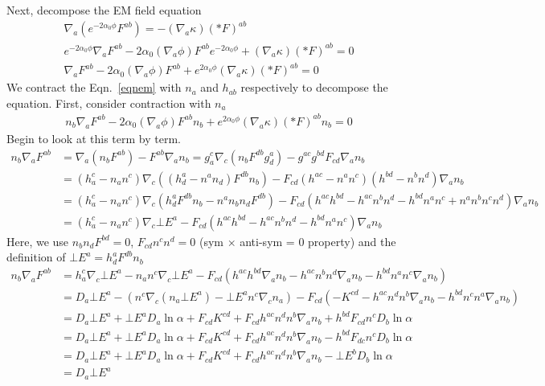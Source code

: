 \documentclass[prd]{revtex4}
\begin{document}
Next, decompose the EM field equation
\begin{align}
\label{eqnem}
\nabla_a \left(e^{-2 \alpha_0 \phi} F^{ab}\right) = - (\nabla_a \kappa) (\ast F)^{ab} \nonumber \\
e^{-2 \alpha_0 \phi} \nabla_a F^{ab} - 2 \alpha_0 (\nabla_a \phi) F^{ab} e^{-2 \alpha_0 \phi} + (\nabla_a \kappa) (\ast F)^{ab}=0 \nonumber \\
\nabla_a F^{ab} - 2 \alpha_0 (\nabla_a \phi) F^{ab}  + e^{2 \alpha_0 \phi} (\nabla_a \kappa) (\ast F)^{ab}=0 
\end{align}
We contract the Eqn.~\ref{eqnem} with $n_a$ and $h_{ab}$ respectively to decompose the equation. First, consider contraction with $n_a$
\begin{align}
n_b \nabla_a F^{ab} - 2 \alpha_0 (\nabla_a \phi) F^{ab} n_b  + e^{2 \alpha_0 \phi} (\nabla_a \kappa) (\ast F)^{ab} n_b=0 
\end{align}
Begin to look at this term by term.
\begin{align}
n_b \nabla_a F^{ab} &= \nabla_a  (n_b F^{ab}) - F^{ab} \nabla_a n_b = g^c_a \nabla_c  (n_b F^{db} g^a_d) - g^{ac} g^{bd} F_{cd} \nabla_a n_b \nonumber \\
			&=(h_a^c - n_a n^c) \nabla_c ((h_d^a - n^a n_d) F^{db} n_b) - F_{cd} (h^{ac} - n^a n^c)(h^{bd} - n^b n^d) \nabla_a n_b \nonumber \\	
			&= (h_a^c - n_a n^c) \nabla_c (h_d^a F^{db} n_b - n^a n_b n_d F^{db}) - F_{cd} (h^{ac} h^{bd} - h^{ac} n^b n^d - h^{bd} n^a n^c +n^a n^b n^c n^d) \nabla_a n_b \nonumber \\
			&= (h_a^c - n_a n^c) \nabla_c \bot E^a - F_{cd} (h^{ac} h^{bd} - h^{ac} n^b n^d - h^{bd} n^a n^c) \nabla_a n_b \nonumber
\end{align}
Here, we use $n_b n_d F^{bd} = 0$, $F_{cd} n^c n^d = 0$ (sym $\times$ anti-sym = 0 property) and the definition of $\bot E^a = h_d^a F^{db} n_b$
\begin{align}
\label{eqn7}
n_b \nabla_a F^{ab} &= h_a^c \nabla_c \bot E^a - n_a n^c \nabla_c \bot E^a - F_{cd} (h^{ac} h^{bd} \nabla_a n_b - h^{ac} n^b n^d \nabla_a n_b - h^{bd} n^a n^c \nabla_a n_b) \nonumber \\
				&= D_a \bot E^a - (n^c \nabla_c (n_a \bot E^a) - \bot E^a n^c \nabla_c n_a)- F_{cd} (-K^{cd} - h^{ac} n^d n^b \nabla_a n_b - h^{bd} n^c n^a \nabla_a n_b) \nonumber \\
				&= D_a \bot E^a + \bot E^a D_a \ln \alpha + F_{cd} K^{cd} + F_{cd} h^{ac} n^d n^b \nabla_a n_b + h^{bd} F_{cd} n^c D_b \ln \alpha \nonumber \\
				&= D_a \bot E^a + \bot E^a D_a \ln \alpha + F_{cd} K^{cd} + F_{cd} h^{ac} n^d n^b \nabla_a n_b - h^{bd} F_{dc} n^c D_b \ln \alpha \nonumber \\
				&= D_a \bot E^a + \bot E^a D_a \ln \alpha + F_{cd} K^{cd} + F_{cd} h^{ac} n^d n^b \nabla_a n_b - \bot E^b D_b \ln \alpha \nonumber \\ 
				& = D_a \bot E^a
\end{align}
\end{document}
